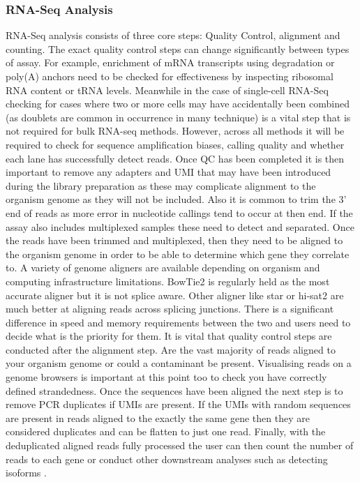 \documentclass[../main.tex]{subfiles}
\begin{document}
\subsubsection{RNA-Seq Analysis}

RNA-Seq analysis consists of three core steps: Quality Control, alignment and counting. The exact quality control steps can change significantly between types of assay.
For example, enrichment of mRNA transcripts using degradation or poly(A) anchors need to be checked for effectiveness by inspecting ribosomal RNA content or tRNA levels.
Meanwhile in the case of single-cell RNA-Seq checking for cases where two or more cells may have accidentally been combined (as doublets are common in occurrence in many technique) is a vital step that is not required for bulk RNA-seq methods.
However, across all methods it will be required to check for sequence amplification biases, calling quality and whether each lane has successfully detect reads.
Once QC has been completed it is then important to remove any adapters and UMI that may have been introduced during the library preparation as these may complicate alignment to the organism genome as they will not be included. 
Also it is common to trim the 3' end of reads as more error in nucleotide callings tend to occur at then end. 
If the assay also includes multiplexed samples these need to detect and separated. Once the reads have been trimmed and multiplexed, then they need to be aligned to the organism genome in order to be able to determine which gene they correlate to.
A variety of genome aligners are available depending on organism and computing infrastructure limitations.  
BowTie2 is regularly held as the most accurate aligner but it is not splice aware.
Other aligner like star or hi-sat2 are much better at aligning reads across splicing junctions. 
There is a significant difference in speed and memory requirements between the two and users need to decide what is the priority for them.
It is vital that quality control steps are conducted after the alignment step.
Are the vast majority of reads aligned to your organism genome or could a contaminant be present. 
Visualising reads on a genome browsers is important at this point too to check you have correctly defined strandedness. 
Once the sequences have been aligned the next step is to remove PCR duplicates if UMIs are present. 
If the UMIs with random sequences are present in reads aligned to the exactly the same gene then they are considered duplicates and can be flatten to just one read. 
Finally, with the deduplicated aligned reads fully processed the user can then count the number of reads to each gene or conduct other downstream analyses such as detecting isoforms \parencite{Conesa2016}.
\end{document}
